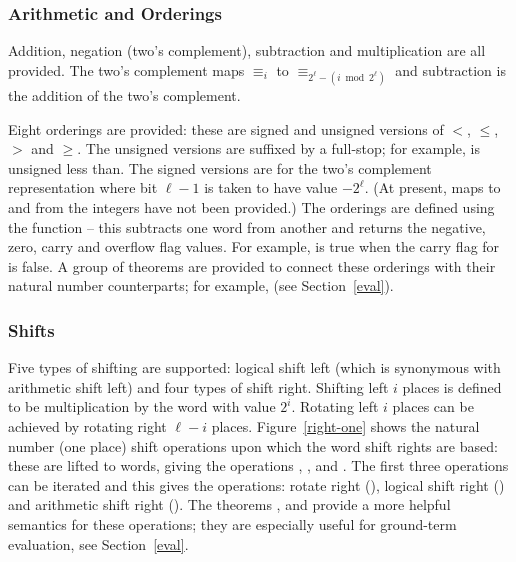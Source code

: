 \subsubsection{Arithmetic and Orderings}

Addition, negation (two's complement), subtraction and multiplication are all provided.  The two's complement maps ${\equiv_i}$ to ${\equiv_{2^\ell - (i \bmod 2^\ell)}}$ and subtraction is the addition of the two's complement.

Eight orderings are provided: these are signed and unsigned versions of $<$, $\leq$, $>$ and $\geq$.  The unsigned versions are suffixed by a full-stop; for example,  is unsigned less than.  The signed versions are for the two's complement representation \ie{} where bit $\ell - 1$ is taken to have value $-2^\ell$.  (At present, maps to and from the integers have not been provided.)  The orderings are defined using the function  -- this subtracts one word from another and returns the negative, zero, carry and overflow flag values.  For example,  is true when the carry flag for  is false.  A group of theorems are provided to connect these orderings with their natural number counterparts; for example,  (see Section~\ref{eval}).

\subsubsection{Shifts}

Five types of shifting are supported: logical shift left (which is synonymous with arithmetic shift left) and four types of shift right.
Shifting left $i$ places is defined to be multiplication by the word with value $2^i$.
Rotating left $i$ places can be achieved by rotating right $\ell - i$ places.
Figure~\ref{right-one} shows the natural number (one place) shift operations upon which the word shift rights are based: these are lifted to words, giving the operations , ,  and .
The first three operations can be iterated and this gives the operations: rotate right (\ml{\#>>}), logical shift right (\ml{>>>}) and arithmetic shift right (\ml{>>}).  The theorems ,  and  provide a more helpful semantics for these operations; they are especially useful for ground-term evaluation, see Section~\ref{eval}.

